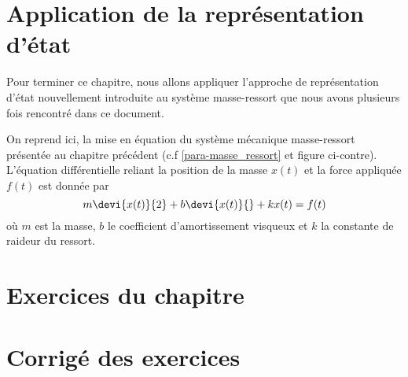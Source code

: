 \section{Application de la représentation d'état}
Pour terminer ce chapitre, nous allons appliquer l'approche de représentation
d'état nouvellement introduite au système masse-ressort que nous avons 
plusieurs fois rencontré dans ce document. 

On reprend ici, la mise en équation du système mécanique masse-ressort 
présentée au chapitre précédent (c.f \cref{para-masse_ressort} et figure 
ci-contre). L'équation différentielle reliant la position de la masse $x(t)$ et 
la force appliquée $f(t)$ est donnée par 
\[
m\devi{x(t)}{2}+b\devi{x(t)}{}+kx(t)=f(t)
\]
où $m$ est la masse, $b$ le coefficient d'amortissement visqueux et $k$ la
constante de raideur du ressort. 
\begin{marginfigure}
    \centering
    
\end{marginfigure}

\clearpage
\section{Exercices du chapitre}
\newpage
\section{Corrigé des exercices}

